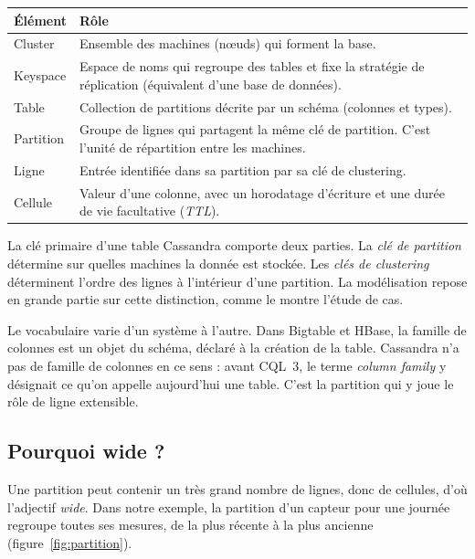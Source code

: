 \documentclass[11pt,a4paper]{article}
\begin{document}
\begin{center}
\begin{tabularx}{\textwidth}{@{}lX@{}}
\toprule
Élément & Rôle \\
\midrule
Cluster & Ensemble des machines (nœuds) qui forment la base. \\
Keyspace & Espace de noms qui regroupe des tables et fixe la stratégie de réplication (équivalent d'une base de données). \\
Table & Collection de partitions décrite par un schéma (colonnes et types). \\
Partition & Groupe de lignes qui partagent la même clé de partition. C'est l'unité de répartition entre les machines. \\
Ligne & Entrée identifiée dans sa partition par sa clé de clustering. \\
Cellule & Valeur d'une colonne, avec un horodatage d'écriture et une durée de vie facultative (\emph{TTL}). \\
\bottomrule
\end{tabularx}
\end{center}

La clé primaire d'une table Cassandra comporte deux parties. La \emph{clé de partition} détermine sur quelles machines la donnée est stockée. Les \emph{clés de clustering} déterminent l'ordre des lignes à l'intérieur d'une partition. La modélisation repose en grande partie sur cette distinction, comme le montre l'étude de cas.

Le vocabulaire varie d'un système à l'autre. Dans Bigtable et HBase, la famille de colonnes est un objet du schéma, déclaré à la création de la table. Cassandra n'a pas de famille de colonnes en ce sens : avant CQL~3, le terme \emph{column family} y désignait ce qu'on appelle aujourd'hui une table. C'est la partition qui y joue le rôle de ligne extensible.

\subsection{Pourquoi \og wide \fg{} ?}
Une partition peut contenir un très grand nombre de lignes, donc de cellules, d'où l'adjectif \emph{wide}. Dans notre exemple, la partition d'un capteur pour une journée regroupe toutes ses mesures, de la plus récente à la plus ancienne (figure~\ref{fig:partition}).
\end{document}
